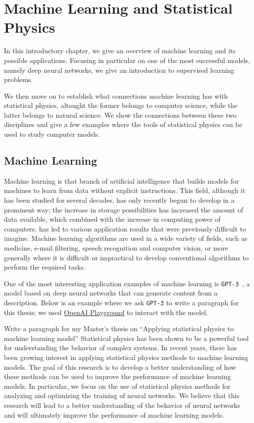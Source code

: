\chapter{Machine Learning and Statistical Physics}
In this introductory chapter, we give an overview of machine learning and its possible applications.
Focusing in particular on one of the most successful models, namely deep neural networks,
we give an introduction to supervised learning problems.

We then move on to establish what connections machine learning has with statistical physics,
altought the former belongs to computer science, while the latter belongs to natural science.
We show the connections between these two disciplines
and give a few examples where the tools of statistical physics can be used to study computer models.

 \section{Machine Learning}
 Machine learning is that branch of artificial intelligence that builds models for machines to learn from data without explicit instructions.
 This field, although it has been studied for several decades, has only recently begun to develop in a prominent way;
 the increase in storage possibilities has increased the amount of data available, which combined with the increase in computing power of computers,
 has led to various application results that were previously difficult to imagine.
 Machine learning algorithms are used in a wide variety of fields, such as medicine, e-mail filtering,
 speech recognition and computer vision, or more generally where it is difficult or impractical to develop conventional algorithms to perform the required tasks.

 One of the most interesting application examples of machine learning is \texttt{GPT-3}~\cite{brown2020language},
 a model based on deep neural networks that can generate content from a description.
 Below is an example where we ask \texttt{GPT-3} to write a paragraph for this thesis;
 we used \href{https://beta.openai.com/playground/}{OpenAI Playground} to interact with the model.
\begin{dialogue}
   Write a paragraph for my Master's thesis on ``Applying statistical physics to machine learning model''
   Statistical physics has been shown to be a powerful tool for understanding the behavior of complex systems. In recent years, there has been growing interest in applying statistical physics methods to machine learning models. The goal of this research is to develop a better understanding of how these methods can be used to improve the performance of machine learning models. In particular, we focus on the use of statistical physics methods for analyzing and optimizing the training of neural networks. We believe that this research will lead to a better understanding of the behavior of neural networks and will ultimately improve the performance of machine learning models.
\end{dialogue}

